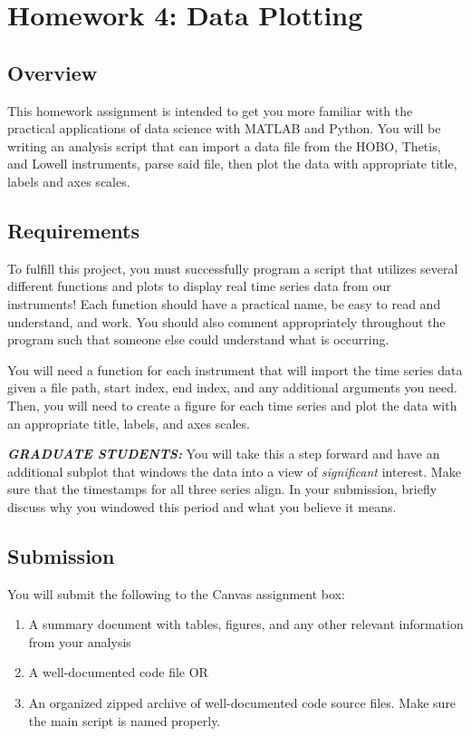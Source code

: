 \documentclass[
	letterpaper, %
	fontsize=10pt, %
	twoside=true, %
	numbers=noenddot, %
]{kaobook}
\begin{document}
\chapter*{Homework 4: Data Plotting}

\section*{Overview}
This homework assignment is intended to get you more familiar with the practical applications of data science with MATLAB and Python.
You will be writing an analysis script that can import a data file from the HOBO, Thetis, and Lowell instruments, parse said file, then plot the data with appropriate title, labels and axes scales. 

\section*{Requirements}
To fulfill this project, you must successfully program a script that utilizes several different functions and plots to display real time series data from our instruments!
Each function should have a practical name, be easy to read and understand, and work.
You should also comment appropriately throughout the program such that someone else could understand what is occurring.

You will need a function for each instrument that will import the time series data given a file path, start index, end index, and any additional arguments you need.
Then, you will need to create a figure for each time series and plot the data with an appropriate title, labels, and axes scales.

\textbf{\emph{GRADUATE STUDENTS:}} You will take this a step forward and have an additional subplot that windows the data into a view of \emph{significant} interest. 
Make sure that the timestamps for all three series align.
In your submission, briefly discuss why you windowed this period and what you believe it means.

\section*{Submission}
You will submit the following to the Canvas assignment box:
\begin{enumerate}
    \item A summary document with tables, figures, and any other relevant information from your analysis
    \item A well-documented code file OR
    \item An organized zipped archive of well-documented code source files. Make sure the main script is named properly.
\end{enumerate}
\end{document}
